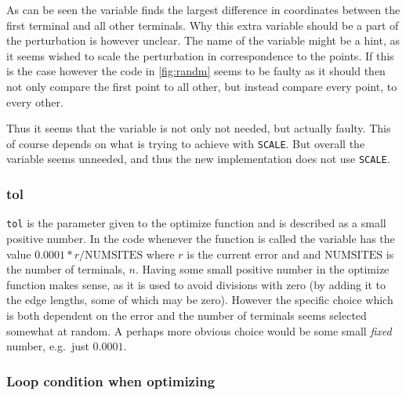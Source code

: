 As can be seen the variable finds the largest difference in coordinates between the first
terminal and all other terminals. Why this extra variable should be a part of
the perturbation is however unclear. The name of the variable might be a hint,
as it seems \citeauthor{smith1992} wished to scale the perturbation in correspondence to the
points. If this is the case however the code in \cref{fig:randm} seems to be
faulty as it should then not only compare the first point to all other, but
instead compare every point, to every other.

Thus it seems that the variable is not only not needed, but actually faulty.
This of course depends on what \citeauthor{smith1992} is trying to achieve with \texttt{SCALE}.
But overall the variable seems unneeded, and thus the new implementation does
not use \texttt{SCALE}.

\subsubsection{tol}
\label{sec:tol}

\texttt{tol} is the parameter given to the optimize function and is described as
a small positive number. In the code whenever the function is called the
variable has the value $0.0001*r/\text{NUMSITES}$ where $r$ is the current
error and and $\text{NUMSITES}$ is the number of terminals, $n$. Having some
small positive number in the optimize function makes sense, as it is used to
avoid divisions with zero (by adding it to the edge lengths, some of which may
be zero). However the specific choice which is both dependent on the error and
the number of terminals seems selected somewhat at random. A perhaps more
obvious choice would be some small \textit{fixed} number, e.g.\ just $0.0001$.


\subsubsection{Loop condition when optimizing}
\label{sec:loop-condition-when-1}

